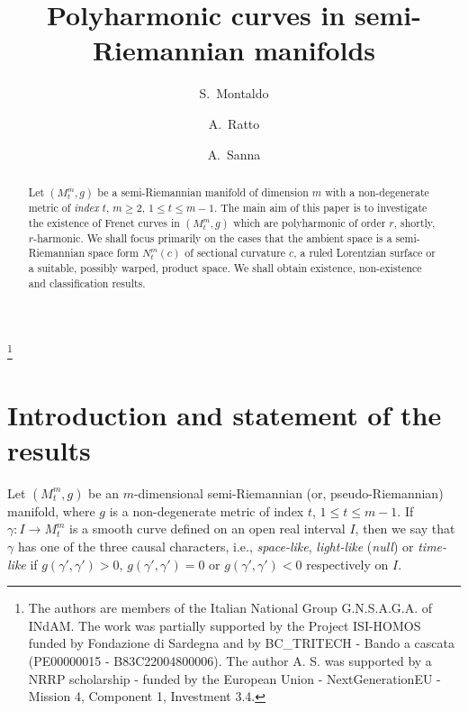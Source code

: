\documentclass[11pt]{amsart}
\title[Polyharmonic curves]{Polyharmonic curves in semi-Riemannian manifolds}
\author{S.~Montaldo}
\author{A.~Ratto}
\author{A.~Sanna}
\theoremstyle{plain}
\theoremstyle{definition}
\numberwithin{equation}{section}
\begin{document}
\begin{abstract}
Let $(M^m_t,g)$ be a semi-Riemannian manifold of dimension
$m$ with a non-degenerate metric of \textit{index} $t$, $m\geq 2$, $1 \leq t \leq m-1$. The main aim of this paper is to investigate the existence of Frenet curves in $(M^m_t,g)$ which are polyharmonic of order $r$, shortly, $r$-harmonic. We shall focus primarily on the cases that the ambient space is a semi-Riemannian space form $N^m_t(c)$ of sectional curvature $c$, a ruled Lorentzian surface or a suitable, possibly warped, product space. 
We shall obtain existence, non-existence and classification results. 
\end{abstract}



\thanks{The authors are members of the Italian National Group G.N.S.A.G.A. of INdAM. The work was partially supported by the Project {ISI-HOMOS} funded by Fondazione di Sardegna and by BC\_TRITECH - Bando a cascata (PE00000015 - B83C22004800006).  The author A. S. was supported by a NRRP scholarship -  funded by the European Union - NextGenerationEU - Mission 4, Component 1, 
Investment 3.4.}
\maketitle
\section{Introduction and statement of the results}\label{Sec-Intro}

Let $(M^m_t,g)$ be an $m$-dimensional semi-Riemannian (or, pseudo-Riemannian) manifold, where $g$ is a non-degenerate metric of index $t$, $1\leq t \leq m-1$. If $\gamma: I\to M^m_t$ is a smooth curve defined on an open real interval $I$, then we say that $\gamma$ has one of the three causal characters, i.e., \textit{space-like}, \textit{light-like} (\textit{null}) or \textit{time-like} if $g\left (\gamma',\gamma'\right ) >0$, $g\left (\gamma',\gamma'\right )=0$ or $g\left (\gamma',\gamma'\right )<0$ respectively on $I$.
\end{document}
